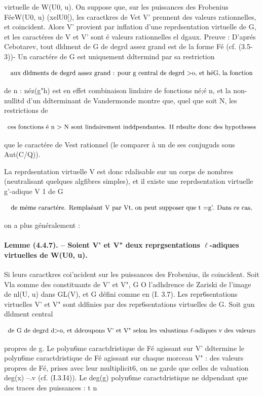 \documentclass[11pt]{article}
\theoremstyle{remark}
\begin{document}
virtuelle de W(U0, u). On suppose que, sur les puissances des Frobenius FéeW(U0, u) (xelU0[), les caractkres de Vet V' prennent des valeurs rationnelles, et coincident. Alors V' provient par inflation d'une reprdsentation virtuelle de G, et les caractéres de V et V' sont é valeurs rationnelles el dgaux. Preuve : D'aprés Cebotarev, tout dldment de G de degrd assez grand est de la forme Fé (cf. (3.5-3))- Un caractére de G est uniquement ddtermind par sa restriction

\[\text{\small aux dldments de degrd assez grand : pour g central de degrd >o, et héG, la fonction}\]

de n : néz(g"h) est en effet combinaison lindaire de fonctions né;é n, et la non-nullitd d'un ddterminant de Vandermonde montre que, quel que soit N, les restrictions de

\[\text{\small ces fonctions é n > N sont lindairement inddpendantes. II rdsulte donc des hypotheses}\]

que le caractére de Vest rationnel (le comparer à un de ses conjuguds sous Aut(C/Q)).

La reprdsentation virtuelle V est donc rdalisable sur un corps de nombres (neutralisant quelques algfibres simples), et il existe une reprdsentation virtuelle g'-adique V 1 de G

\[\text{\small de méme caractére. Remplaéant V par Vt, on peut supposer que t =g'. Dans ce cas,}\]

on a plus généralement :

\paragraph{Lemme (4.4.7). -- Soient V' et V" deux reprgsentations \(\ell\)-adiques virtuelles de W(U0, u).}

Si leurs caractkres coi'ncident sur les puissances des Frobenius, ils coincident. Soit Vla somme des constituants de V' et V", G O l'adhdrence de Zariski de l'image de nl(U, u) dans GL(V), et G défini comme en (I. 3.7). Les repr6sentations virtuelles V' et V" sont ddfinies par des repr6sentations virtuelles de G. Soit gun dldment central

\[\text{\small de G de degrd d>o, et ddcoupons V' et V" selon les valuations \(\ell\)-adiques v des valeurs}\]

propres de g. Le polyn6me caractdristique de Fé agissant sur V' ddtermine le polyn6me caractdristique de Fé agissant sur chaque morceau V" : des valeurs propres de Fé, prises avec leur multiplicit6, on ne garde que celles de valuation deg(x) --.v (cf. (I.3.I4)). Le deg(g) polyn6me caractdristique ne ddpendant que des traces des puissances : t n
\end{document}
